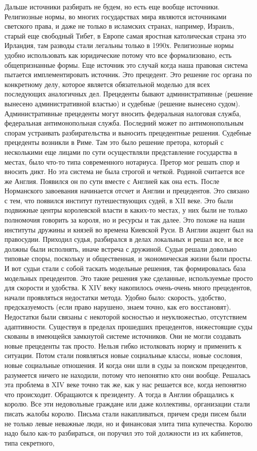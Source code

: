 \documentclass[a4paper, 12pt]{article}
\begin{document}
Дальше источники разбирать не будем, но есть еще вообще источники. Религиозные нормы, во многих государствах мира являются источниками светского права, и даже не только в исламских странах, например, Израиль, старый еще свободный Тибет, в Европе самая яростная католическая страна это Ирландия, там разводы стали легальны только в 1990х. Религиозные нормы удобно использовать как юридические потому что все формализовано, есть общепризнанные формы. Еще источник это случай когда наша правовая система пытается имплементировать источник. Это прецедент. Это решение гос органа по конкретному делу, которое является обязательной моделью для всех последующих аналогичных дел. Прецеденты бывают административные (решение вынесено административной властью) и судебные (решение вынесено судом). Административные прецеденты могут вносить федеральная налоговая служба, федеральная антимонопольная служба. Последний может по антимонопольным спорам устраивать разбирательства и выносить прецедентные решения. Судебные прецеденты возникли в Риме. Там это было решение претора, который с несколькими еще лицами по сути осуществляли представление государства в местах, было что-то типа современного нотариуса. Претор мог решать спор и вносить дикт. Но эта система не была строгой и четкой. Родиной считается все же Англия. Появился он по сути вместе с Англией как она есть. После Норманского завоевания начинается отсчет и Англии и прецедентов. Это связано с тем, что появился институт путешествующих судей, в XII веке. Это были подвижные центры королевской власти в каких-то местах, у них были не только полномочия говорить за короля, но и ресурсы и так далее. Это похоже на наши институты дружины и князей во времена Киевской Руси. В Англии акцент был на правосудии. Приходил судья, разбирался в делах локальных и решал все, и все должны были исполнять, иначе встреча с дружиной. Судьи решали довольно типовые споры, поскольку и общественная, и экономическая жизни были просты. И вот судьи стали с собой таскать модельные решения, так формировалась база модельных прецедентов. Это такие решения уже сделанные, используемые просто для скорости и удобства. К XIV веку накопилось очень-очень много прецедентов, начали проявляться недостатки метода. Удобно было: скорость, удобство, предсказуемость (если право нарушено, знаем точно, как его восстановят). Недостатки были связаны с некоторой косностью и неуклюжестью, отсутствием адаптивности. Существуя в пределах прошедших прецедентов, нижестоящие суды скованы в имеющейся замкнутой системе источников. Они не могли создавать новые прецеденты так просто. Нельзя гибко истолковать норму и применить к ситуации. Потом стали появляться новые социальные классы, новые сословия, новые социальные отношения. И когда они шли в суды за поиском прецедентов, разумеется ничего не находили, потому что непонятно кто они вообще. Решалась эта проблема в XIV веке точно так же, как у нас решается все, когда непонятно что происходит. Обращаются к президенту. А тогда в Англии обращались к королю. Все эти недовольные граждане или даже коллективы, организации стали писать жалобы королю. Письма стали накапливаться, причем среди писем были не только левые неважные люди, но и финансовая элита типа купечества. Королю надо было как-то разбираться, он поручил это той должности из их кабинетов, типа секретного, 
\end{document}
